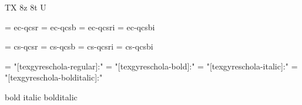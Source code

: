 
\ifx\ffdecl\undefined  \fi

\ffdecl [TG Schola] {\caps} {\rm \bf \it \bi} {} {TX} {8z 8t U}

\def\caps{\ffsetV{caps}{-sc}\ffsetX}  \def\nocaps{\ffsetV{caps}{}\ffsetX}
\def\capsV{} 

\ismacro{}\ifttrue

   \font\tenrm = ec-qcsr  \sizespec
   \font\tenbf = ec-qcsb  \sizespec
   \font\tenit = ec-qcsri \sizespec
   \font\tenbi = ec-qcsbi \sizespec

   \def\ffnamegen{ec-qcs\ffvarV\capsV}

\fi

\ismacro{}\iftrue

   \font\tenrm = cs-qcsr  \sizespec
   \font\tenbf = cs-qcsb  \sizespec
   \font\tenit = cs-qcsri \sizespec
   \font\tenbi = cs-qcsbi \sizespec

   \def\ffnamegen{cs-qcs\ffvarV\capsV}
   

\fi

\ismacro{}\iftrue

   \font\tenrm = "[texgyreschola-regular]:\fontfeatures"    \sizespec
   \font\tenbf = "[texgyreschola-bold]:\fontfeatures"       \sizespec
   \font\tenit = "[texgyreschola-italic]:\fontfeatures"     \sizespec
   \font\tenbi = "[texgyreschola-bolditalic]:\fontfeatures" \sizespec

   \def\ffnamegen{"[texgyreschola-\ffvarV]:\capsV\fontfeatures"} 

    {bold} {italic} {bolditalic}
   \def\caps{\ffsetV{caps}{+smcp;}\ffsetX}

\fi
\tenrm %

\ifx\loadmathfonts\relax \endinput \fi
\ifx\mathpreloaded X\else  \fi                     

\endinput
